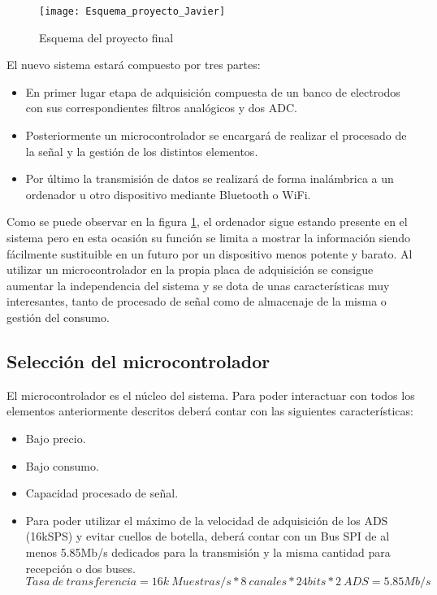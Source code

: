\begin{figure} [h]
    \centering
    \texttt{[image: Esquema\_proyecto\_Javier]}
    \caption{Esquema del proyecto final}
    \label{fig:Esquema_proyecto_Javier}
\end{figure}

El nuevo sistema estará compuesto por tres partes:
\begin{itemize}
\item En primer lugar etapa de adquisición compuesta de un banco de electrodos con sus correspondientes filtros analógicos y dos \acrshort{ADC}. 
\item Posteriormente un microcontrolador se encargará de realizar el procesado de la señal y la gestión de los distintos elementos.
\item Por último la transmisión de datos se realizará de forma inalámbrica a un ordenador u otro dispositivo mediante Bluetooth o WiFi.
\end{itemize}

Como se puede observar en la figura \ref{fig:Esquema_proyecto_Javier}, el ordenador sigue estando presente en el sistema pero en esta ocasión su función se limita a mostrar la información siendo fácilmente sustituible en un futuro por un dispositivo menos potente y barato. Al utilizar un microcontrolador en la propia placa de adquisición se consigue aumentar la independencia del sistema y se dota de unas características muy interesantes, tanto de procesado de señal como de almacenaje de la misma o gestión del consumo.

\subsection{Selección del microcontrolador\label{sec:Sel_micro}}

El microcontrolador es el núcleo del sistema. Para poder interactuar con todos los elementos anteriormente descritos deberá contar con las siguientes características:
\begin{itemize}
\item Bajo precio.
\item Bajo consumo.
\item Capacidad procesado de señal.
\item Para poder utilizar el máximo de la velocidad de adquisición de los ADS (16k\acrshort{SPS}) y evitar cuellos de botella, deberá contar con un Bus SPI de al menos 5.85Mb/s dedicados para la transmisión y la misma cantidad para recepción o dos buses.
\[Tasa\ de\ transferencia = 16k\ Muestras/s * 8\ canales * 24bits * 2\ ADS = 5.85Mb/s\]

\end{itemize}


